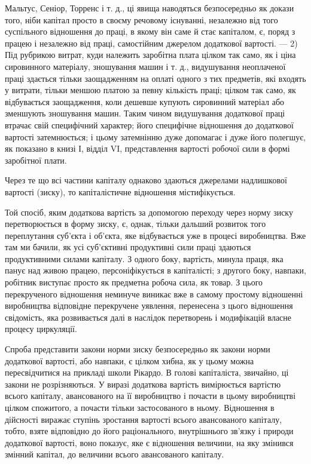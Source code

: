 \parcont{}  %
Мальтус, Сеніор, Торренс і т. д., ці явища наводяться безпосередньо
як докази того, ніби капітал просто в своєму речовому
існуванні, незалежно від того суспільного відношення до
праці, в якому він саме й стає капіталом, є, поряд з працею
і незалежно від праці, самостійним джерелом додаткової вартості.
— 2) Під рубрикою витрат, куди належить заробітна плата
цілком так само, як і ціна сировинного матеріалу, зношування
машин і т. д., видушування неоплаченої праці здається тільки
заощадженням на оплаті одного з тих предметів, які входять
у витрати, тільки меншою платою за певну кількість праці;
цілком так само, як відбувається заощадження, коли дешевше
купують сировинний матеріал або зменшують зношування машин.
Таким чином видушування додаткової праці втрачає свій
специфічний характер; його специфічне відношення до додаткової
вартості затемнюється; і цьому затемнінню дуже допомагає
і дуже його полегшує, як показано в книзі І, відділ VI,
представлення вартості робочої сили в формі заробітної плати.

Через те що всі частини капіталу однаково здаються джерелами
надлишкової вартості (зиску), то капіталістичне відношення
містифікується.

Той спосіб, яким додаткова вартість за допомогою переходу
через норму зиску перетворюється в форму зиску, є, однак,
тільки дальший розвиток того переплутання суб’єкта і об’єкта,
яке відбувається уже в процесі виробництва. Вже там ми бачили,
як усі суб’єктивні продуктивні сили праці здаються продуктивними
силами капіталу. З одного боку, вартість, минула праця,
яка панує над живою працею, персоніфікується в капіталісті;
з другого боку, навпаки, робітник виступає просто як предметна
робоча сила, як товар. З цього перекрученого відношення неминуче
виникає вже в самому простому відношенні виробництва
відповідне перекручене уявлення, перенесена з цього відношення
свідомість, яка розвивається далі в наслідок перетворень і модифікацій
власне процесу циркуляції.

Спроба представити закони норми зиску безпосередньо як закони
норми додаткової вартості, або навпаки, є цілком хибна, як
у цьому можна пересвідчитися на прикладі школи Рікардо. В голові
капіталіста, звичайно, ці закони не розрізняються. У виразі 
додаткова вартість вимірюється вартістю всього капіталу, авансованого
на її виробництво і почасти в цьому виробництві цілком спожитого,
а почасти тільки застосованого в ньому. Відношення  в
дійсності виражає ступінь зростання вартості всього авансованого
капіталу, тобто, взяте відповідно до його раціонального, внутрішнього
зв’язку і природи додаткової вартості, воно показує,
яке є відношення величини, на яку змінився змінний капітал, до
величини всього авансованого капіталу.
